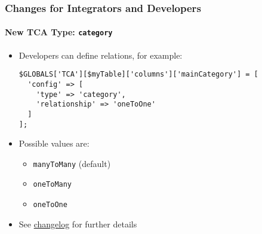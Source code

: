 %

\begin{frame}[fragile]
	\frametitle{Changes for Integrators and Developers}
	\framesubtitle{New TCA Type: \texttt{category}}


	\begin{itemize}
		\item Developers can define relations, for example:
\begin{lstlisting}
$GLOBALS['TCA'][$myTable]['columns']['mainCategory'] = [
  'config' => [
    'type' => 'category',
    'relationship' => 'oneToOne'
  ]
];
\end{lstlisting}

		\item Possible values are:
			\begin{itemize}
				\item \texttt{manyToMany} (default)
				\item \texttt{oneToMany}
				\item \texttt{oneToOne}
			\end{itemize}

		\item See \href{https://docs.typo3.org/c/typo3/cms-core/master/en-us/Changelog/11.4/Feature-94622-NewTCATypeCategory.html}{changelog} for further details

	\end{itemize}

\end{frame}

